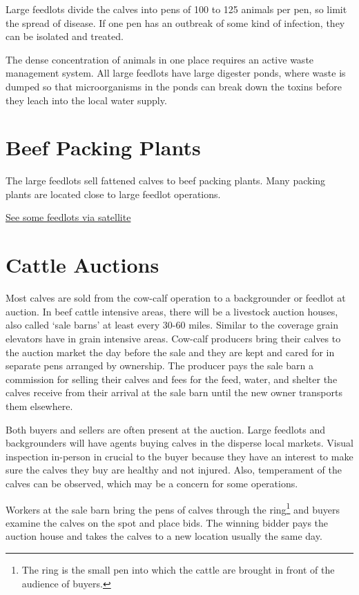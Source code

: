 \documentclass[
  letterpaper,
  DIV=11,
  numbers=noendperiod]{scrreprt}
\begin{document}
Large feedlots divide the calves into pens of 100 to 125 animals per
pen, so limit the spread of disease. If one pen has an outbreak of some
kind of infection, they can be isolated and treated.

The dense concentration of animals in one place requires an active waste
management system. All large feedlots have large digester ponds, where
waste is dumped so that microorganisms in the ponds can break down the
toxins before they leach into the local water supply.

\hypertarget{beef-packing-plants}{%
\section{Beef Packing Plants}\label{beef-packing-plants}}

The large feedlots sell fattened calves to beef packing plants. Many
packing plants are located close to large feedlot operations.

\href{http://maps.google.com}{See some feedlots via satellite}

\hypertarget{cattle-auctions}{%
\section{Cattle Auctions}\label{cattle-auctions}}

Most calves are sold from the cow-calf operation to a backgrounder or
feedlot at auction. In beef cattle intensive areas, there will be a
livestock auction houses, also called `sale barns' at least every 30-60
miles. Similar to the coverage grain elevators have in grain intensive
areas. Cow-calf producers bring their calves to the auction market the
day before the sale and they are kept and cared for in separate pens
arranged by ownership. The producer pays the sale barn a commission for
selling their calves and fees for the feed, water, and shelter the
calves receive from their arrival at the sale barn until the new owner
transports them elsewhere.

Both buyers and sellers are often present at the auction. Large feedlots
and backgrounders will have agents buying calves in the disperse local
markets. Visual inspection in-person in crucial to the buyer because
they have an interest to make sure the calves they buy are healthy and
not injured. Also, temperament of the calves can be observed, which may
be a concern for some operations.

Workers at the sale barn bring the pens of calves through the
ring\footnote{The ring is the small pen into which the cattle are
  brought in front of the audience of buyers.} and buyers examine the
calves on the spot and place bids. The winning bidder pays the auction
house and takes the calves to a new location usually the same day.
\end{document}
